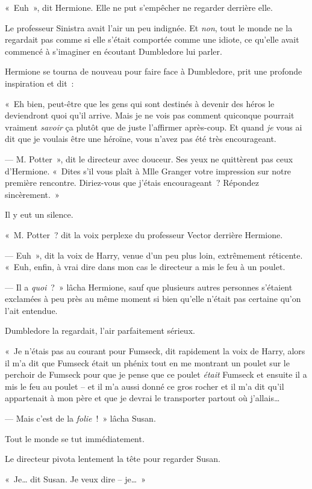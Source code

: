 «~Euh~», dit Hermione. Elle ne put s'empêcher ne regarder derrière elle.

Le professeur Sinistra avait l'air un peu indignée. Et \emph{non}, tout le monde ne la regardait pas comme si elle s'était comportée comme une idiote, ce qu'elle avait commencé à s'imaginer en écoutant Dumbledore lui parler.

Hermione se tourna de nouveau pour faire face à Dumbledore, prit une profonde inspiration et dit~:

«~Eh bien, peut-être que les gens qui sont destinés à devenir des héros le deviendront quoi qu'il arrive. Mais je ne vois pas comment quiconque pourrait vraiment \emph{savoir} ça plutôt que de juste l'affirmer après-coup. Et quand \emph{je} vous ai dit que je voulais être une héroïne, vous n'avez pas été très encourageant.

--- M. Potter~», dit le directeur avec douceur. Ses yeux ne quittèrent pas ceux d'Hermione. «~Dites s'il vous plaît à Mlle Granger votre impression sur notre première rencontre. Diriez-vous que j'étais encourageant~? Répondez sincèrement.~»

Il y eut un silence.

«~M. Potter~? dit la voix perplexe du professeur Vector derrière Hermione.

--- Euh~», dit la voix de Harry, venue d'un peu plus loin, extrêmement réticente. «~Euh, enfin, à vrai dire dans mon cas le directeur a mis le feu à un poulet.

--- Il a \emph{quoi}~?~» lâcha Hermione, sauf que plusieurs autres personnes s'étaient exclamées à peu près au même moment si bien qu'elle n'était pas certaine qu'on l'ait entendue.

Dumbledore la regardait, l'air parfaitement sérieux.

«~Je n'étais pas au courant pour Fumseck, dit rapidement la voix de Harry, alors il m'a dit que Fumseck était un phénix tout en me montrant un poulet sur le perchoir de Fumseck pour que je pense que ce poulet \emph{était} Fumseck et ensuite il a mis le feu au poulet -- et il m'a aussi donné ce gros rocher et il m'a dit qu'il appartenait à mon père et que je devrai le transporter partout où j'allais…

--- Mais c'est de la \emph{folie}~!~» lâcha Susan.

Tout le monde se tut immédiatement.

Le directeur pivota lentement la tête pour regarder Susan.

«~Je… dit Susan. Je veux dire -- je…~»

